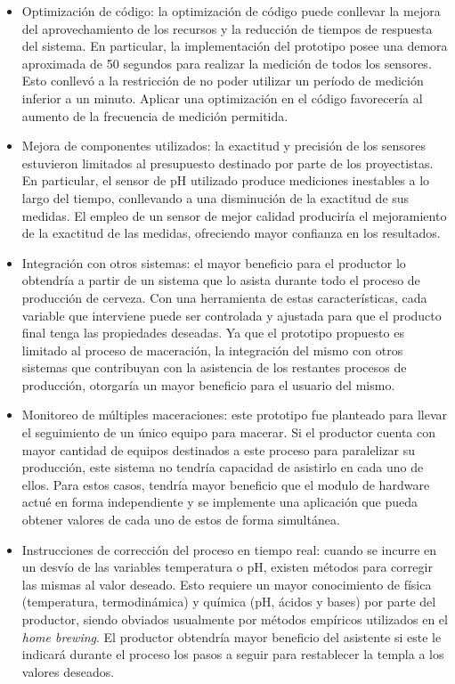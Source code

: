 \begin{itemize}
    \item Optimización de código: la optimización de código puede conllevar la mejora del aprovechamiento de los recursos y la reducción de tiempos de respuesta del sistema. En particular, la implementación del prototipo posee una demora aproximada de 50 segundos para realizar la medición de todos los sensores. Esto conllevó a la restricción de no poder utilizar un período de medición inferior a un minuto. Aplicar una optimización en el código favorecería al aumento de la frecuencia de medición permitida.
    
    \item Mejora de componentes utilizados: la exactitud y precisión de los sensores estuvieron limitados al presupuesto destinado por parte de los proyectistas. En particular, el sensor de pH utilizado produce mediciones inestables a lo largo del tiempo, conllevando a una disminución de la exactitud de sus medidas. El empleo de un sensor de mejor calidad produciría el mejoramiento de la exactitud de las medidas, ofreciendo mayor confianza en los resultados.
    
    \item Integración con otros sistemas: el mayor beneficio para el productor lo obtendría a partir de un sistema que lo asista durante todo el proceso de producción de cerveza. Con una herramienta de estas características, cada variable que interviene puede ser controlada y ajustada para que el producto final tenga las propiedades deseadas. Ya que el prototipo propuesto es limitado al proceso de maceración, la integración del mismo con otros sistemas que contribuyan con la asistencia de los restantes procesos de producción, otorgaría un mayor beneficio para el usuario del mismo.
    
    \item Monitoreo de múltiples maceraciones: este prototipo fue planteado para llevar el seguimiento de un único equipo para macerar. Si el productor cuenta con mayor cantidad de equipos destinados a este proceso para paralelizar su producción, este sistema no tendría capacidad de asistirlo en cada uno de ellos. Para estos casos, tendría mayor beneficio que el modulo de hardware actué en forma independiente y se implemente una aplicación que pueda obtener valores de cada uno de estos de forma simultánea.
    
    \item Instrucciones de corrección del proceso en tiempo real: cuando se incurre en un desvío de las variables temperatura o pH, existen métodos para corregir las mismas al valor deseado. Esto requiere un mayor conocimiento de física (temperatura, termodinámica) y química (pH, ácidos y bases) por parte del productor, siendo obviados usualmente por métodos empíricos utilizados en el \textit{home brewing}. El productor obtendría mayor beneficio del asistente si este le indicará durante el proceso los pasos a seguir para restablecer la templa a los valores deseados.
    

\end{itemize}
